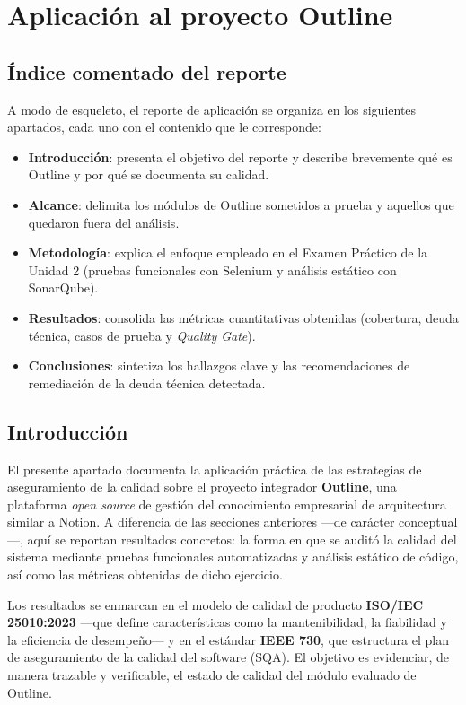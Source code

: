 \documentclass[12pt, letterpaper]{article}
\begin{document}
\section{Aplicación al proyecto Outline}

\subsection{Índice comentado del reporte}

A modo de esqueleto, el reporte de aplicación se organiza en los siguientes apartados, cada uno con el contenido que le corresponde:

\begin{itemize}
  \item \textbf{Introducción}: presenta el objetivo del reporte y describe brevemente qué es Outline y por qué se documenta su calidad.
  \item \textbf{Alcance}: delimita los módulos de Outline sometidos a prueba y aquellos que quedaron fuera del análisis.
  \item \textbf{Metodología}: explica el enfoque empleado en el Examen Práctico de la Unidad 2 (pruebas funcionales con Selenium y análisis estático con SonarQube).
  \item \textbf{Resultados}: consolida las métricas cuantitativas obtenidas (cobertura, deuda técnica, casos de prueba y \textit{Quality Gate}).
  \item \textbf{Conclusiones}: sintetiza los hallazgos clave y las recomendaciones de remediación de la deuda técnica detectada.
\end{itemize}

\subsection{Introducción}

El presente apartado documenta la aplicación práctica de las estrategias de aseguramiento de la calidad sobre el proyecto integrador \textbf{Outline}, una plataforma \textit{open source} de gestión del conocimiento empresarial de arquitectura similar a Notion. A diferencia de las secciones anteriores —de carácter conceptual—, aquí se reportan resultados concretos: la forma en que se auditó la calidad del sistema mediante pruebas funcionales automatizadas y análisis estático de código, así como las métricas obtenidas de dicho ejercicio.

Los resultados se enmarcan en el modelo de calidad de producto \textbf{ISO/IEC 25010:2023} —que define características como la mantenibilidad, la fiabilidad y la eficiencia de desempeño— y en el estándar \textbf{IEEE 730}, que estructura el plan de aseguramiento de la calidad del software (SQA). El objetivo es evidenciar, de manera trazable y verificable, el estado de calidad del módulo evaluado de Outline.
\end{document}
